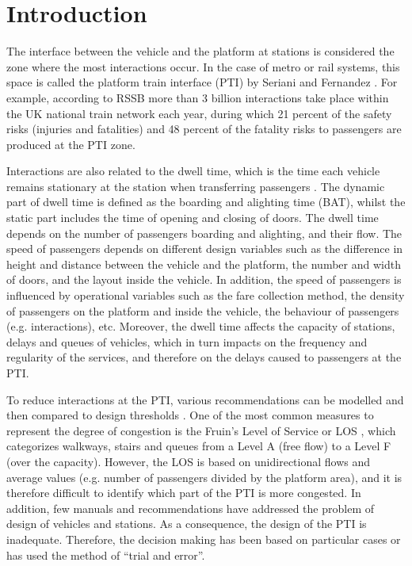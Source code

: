 \section{Introduction}
\label{sec:intro}

The interface between the vehicle and the platform at stations is considered the zone where the most interactions occur. In the case of metro or rail systems, this space is called the platform train interface (PTI) by Seriani and Fernandez \cite{Ref1}. For example, according to RSSB \cite{Ref2} more than 3 billion interactions take place within the UK national train network each year, during which 21 percent of the safety risks (injuries and fatalities) and 48 percent of the fatality risks to passengers are produced at the PTI zone.   

Interactions are also related to the dwell time, which is the time each vehicle remains stationary at the station when transferring passengers \cite{Ref3}. The dynamic part of dwell time is defined as the boarding and alighting time (BAT), whilst the static part includes the time of opening and closing of doors. The dwell time depends on the number of passengers boarding and alighting, and their flow. The speed of passengers depends on different design variables such as the difference in height and distance between the vehicle and the platform, the number and width of doors, and the layout inside the vehicle. In addition, the speed of passengers is influenced by operational variables such as the fare collection method, the density of passengers on the platform and inside the vehicle, the behaviour of passengers (e.g. interactions), etc. Moreover, the dwell time affects the capacity of stations, delays and queues of vehicles, which in turn impacts on the frequency and regularity of the services, and therefore on the delays caused to passengers at the PTI. 

To reduce interactions at the PTI, various recommendations can be modelled and then compared to design thresholds \cite{Ref4}. One of the most common measures to represent the degree of congestion is the Fruin’s Level of Service or LOS \cite{Ref5}, which categorizes walkways, stairs and queues from a Level A (free flow) to a Level F (over the capacity).  However, the LOS is based on unidirectional flows and average values (e.g. number of passengers divided by the platform area), and it is therefore difficult to identify which part of the PTI is more congested. In addition, few manuals and recommendations have addressed the problem of design of vehicles and stations. As a consequence, the design of the PTI is inadequate. Therefore, the decision making has been based on particular cases or has used the method of “trial and error”.

